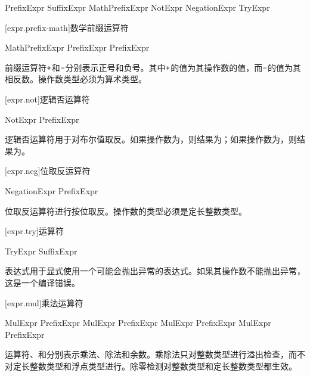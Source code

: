 \begin{bnf}{PrefixExpr}
    SuffixExpr \br
    MathPrefixExpr \br
    NotExpr \br
    NegationExpr \br
    TryExpr
\end{bnf}

[expr.prefix-math]{数学前缀运算符}

\begin{bnf}{MathPrefixExpr}
    \terminal{+} PrefixExpr \br
    \terminal{-} PrefixExpr
\end{bnf}

\pnum
前缀运算符$\mathbin{\texttt{+}}$和$\mathbin{\texttt{-}}$分别表示正号和负号。其中$\mathbin{\texttt{+}}$的值为其操作数的值，而$\mathbin{\texttt{-}}$的值为其相反数。操作数类型必须为算术类型。

[expr.not]{逻辑否运算符}

\begin{bnf}{NotExpr}
    \terminal{!} PrefixExpr
\end{bnf}

\pnum
逻辑否运算符\tcode{!}用于对布尔值取反。如果操作数为，则结果为；如果操作数为，则结果为。

[expr.neg]{位取反运算符}

\begin{bnf}{NegationExpr}
     PrefixExpr
\end{bnf}

\pnum
位取反运算符进行按位取反。操作数的类型必须是定长整数类型。

[expr.try]{运算符}

\begin{bnf}{TryExpr}
     SuffixExpr
\end{bnf}

\pnum
{}表达式用于显式使用一个可能会抛出异常的表达式。如果其操作数不能抛出异常，这是一个编译错误。

[expr.mul]{乘法运算符}

\begin{bnf}{MulExpr}
    PrefixExpr \br
    MulExpr \terminal{*} PrefixExpr \br
    MulExpr \terminal{/} PrefixExpr \br
    MulExpr \terminal{\%} PrefixExpr
\end{bnf}

\pnum
运算符\tcode{*}、\tcode{/}和\tcode{\%}分别表示乘法、除法和余数。乘除法只对整数类型进行溢出检查，而不对定长整数类型和浮点类型进行。除零检测对整数类型和定长整数类型都生效。

